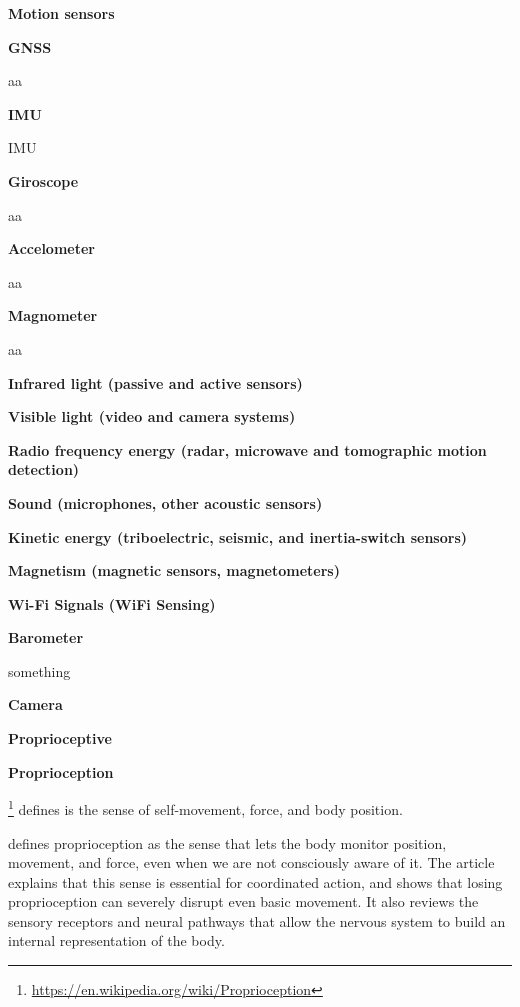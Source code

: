 \documentclass{book}
\providecommand{\ProjectDeepHeading}[2]{%
    \par\medskip\noindent\textbf{#2}\par\smallskip
}
\providecommand{\clickurlfooter}[1]{\footnote{\url{#1}}}
\begin{document}

\ProjectDeepHeading{8}{Motion sensors}
    
    \ProjectDeepHeading{8}{GNSS}
        aa
    
    \ProjectDeepHeading{8}{IMU}
        IMU
        
        \ProjectDeepHeading{9}{Giroscope}
            aa
        
        \ProjectDeepHeading{9}{Accelometer}
            aa
        
        \ProjectDeepHeading{9}{Magnometer}
            aa
    
    \ProjectDeepHeading{8}{Infrared light (passive and active sensors)}
    
    \ProjectDeepHeading{8}{Visible light (video and camera systems)}
    
    \ProjectDeepHeading{8}{Radio frequency energy (radar, microwave and tomographic motion detection)}
    
    \ProjectDeepHeading{8}{Sound (microphones, other acoustic sensors)}
    
    \ProjectDeepHeading{8}{Kinetic energy (triboelectric, seismic, and inertia-switch sensors)}
    
    \ProjectDeepHeading{8}{Magnetism (magnetic sensors, magnetometers)}
    
    \ProjectDeepHeading{8}{Wi-Fi Signals (WiFi Sensing)}
    
    
    \ProjectDeepHeading{7}{Barometer}
    something
    
    \ProjectDeepHeading{7}{Camera}

\ProjectDeepHeading{5}{Proprioceptive}


\ProjectDeepHeading{8}{Proprioception}
        
        \clickurlfooter{https://en.wikipedia.org/wiki/Proprioception} defines is the sense of self-movement, force, and body position.
        
        \cite{tuthill-2018-proprioception} defines proprioception as the sense that lets the body monitor position, movement, and force, even when we are not consciously aware of it.
        The article explains that this sense is essential for coordinated action, and shows that losing proprioception can severely disrupt even basic movement.
        It also reviews the sensory receptors and neural pathways that allow the nervous system to build an internal representation of the body.
\end{document}

